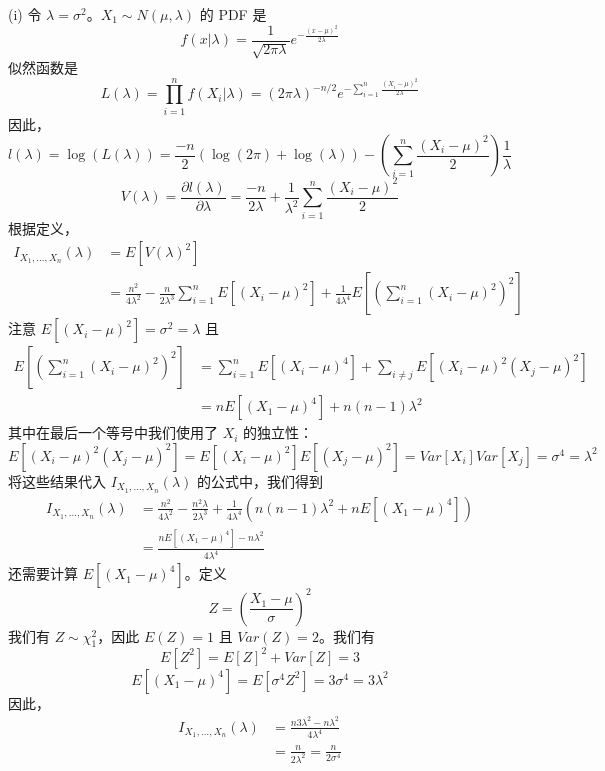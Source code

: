 \begin{questions}
\begin{solution}
(i) 令 $\lambda = \sigma^2$。$X_1 \sim N(\mu, \lambda)$ 的 PDF 是
\[
f(x|\lambda) = \frac{1}{\sqrt{2\pi\lambda}} e^{-\frac{(x-\mu)^2}{2\lambda}}
\]
似然函数是
\[
L(\lambda) = \prod_{i=1}^n f(X_i|\lambda) = (2\pi\lambda)^{-n/2} e^{-\sum_{i=1}^n \frac{(X_i-\mu)^2}{2\lambda}}
\]
因此，
\[
l(\lambda) = \log(L(\lambda)) = \frac{-n}{2} (\log(2\pi) + \log(\lambda)) - \left(\sum_{i=1}^n \frac{(X_i-\mu)^2}{2}\right) \frac{1}{\lambda}
\]
\[
V(\lambda) = \frac{\partial l(\lambda)}{\partial \lambda} = \frac{-n}{2\lambda} + \frac{1}{\lambda^2} \sum_{i=1}^n \frac{(X_i-\mu)^2}{2}
\]
根据定义，
\begin{align*}
I_{X_1, \dots, X_n}(\lambda) &= E[V(\lambda)^2] \\
&= \frac{n^2}{4\lambda^2} - \frac{n}{2\lambda^3} \sum_{i=1}^n E[(X_i-\mu)^2] + \frac{1}{4\lambda^4} E\left[\left(\sum_{i=1}^n (X_i-\mu)^2\right)^2\right]
\end{align*}
注意 $E[(X_i-\mu)^2] = \sigma^2 = \lambda$ 且
\begin{align*}
E\left[\left(\sum_{i=1}^n (X_i-\mu)^2\right)^2\right] &= \sum_{i=1}^n E[(X_i-\mu)^4] + \sum_{i \neq j} E[(X_i-\mu)^2(X_j-\mu)^2] \\
&= n E[(X_1-\mu)^4] + n(n-1)\lambda^2
\end{align*}
其中在最后一个等号中我们使用了 $X_i$ 的独立性：
\[
E[(X_i-\mu)^2(X_j-\mu)^2] = E[(X_i-\mu)^2] E[(X_j-\mu)^2] = Var[X_i] Var[X_j] = \sigma^4 = \lambda^2
\]
将这些结果代入 $I_{X_1, \dots, X_n}(\lambda)$ 的公式中，我们得到
\begin{align*}
I_{X_1, \dots, X_n}(\lambda) &= \frac{n^2}{4\lambda^2} - \frac{n^2\lambda}{2\lambda^3} + \frac{1}{4\lambda^4} \left(n(n-1)\lambda^2 + n E[(X_1-\mu)^4]\right) \\
&= \frac{n E[(X_1-\mu)^4] - n\lambda^2}{4\lambda^4}
\end{align*}
还需要计算 $E[(X_1-\mu)^4]$。定义
\[
Z = \left(\frac{X_1-\mu}{\sigma}\right)^2
\]
我们有 $Z \sim \chi^2_1$，因此 $E(Z) = 1$ 且 $Var(Z) = 2$。我们有
\[
E[Z^2] = E[Z]^2 + Var[Z] = 3
\]
\[
E[(X_1-\mu)^4] = E[\sigma^4 Z^2] = 3\sigma^4 = 3\lambda^2
\]
因此，
\begin{align*}
I_{X_1, \dots, X_n}(\lambda) &= \frac{n 3\lambda^2 - n\lambda^2}{4\lambda^4} \\
&= \frac{n}{2\lambda^2} = \frac{n}{2\sigma^4}
\end{align*}


\end{solution}
\end{questions}
